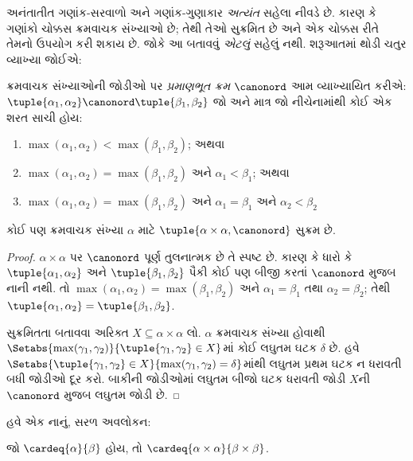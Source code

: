 \label{guunit:OLP-0588}


અનંતાતીત ગણાંક-સરવાળો અને ગણાંક-ગુણાકાર
\emph{અત્યંત} સહેલા નીવડે છે. કારણ કે ગણાંકો
ચોક્કસ ક્રમવાચક સંખ્યાઓ છે; તેથી તેઓ સુક્રમિત
છે અને એક ચોક્કસ રીતે તેમનો ઉપયોગ કરી શકાય છે.
જોકે આ બતાવવું \emph{એટલું} સહેલું નથી. શરૂઆતમાં
થોડી ચતુર વ્યાખ્યા જોઈએ:

\begin{defn}
ક્રમવાચક સંખ્યાઓની જોડીઓ પર \emph{પ્રમાણભૂત ક્રમ}
$\canonord$ આમ વ્યાખ્યાયિત કરીએ:
$\tuple{\alpha_1, \alpha_2} \canonord
\tuple{\beta_1, \beta_2}$ જો અને માત્ર જો નીચેનામાંથી
કોઈ એક શરત સાચી હોય:
\begin{enumerate}
	\item $\max(\alpha_1, \alpha_2) < \max(\beta_1, \beta_2)$; અથવા
	\item $\max(\alpha_1, \alpha_2) = \max(\beta_1, \beta_2)$ અને
	$\alpha_1 < \beta_1$; અથવા
	\item $\max(\alpha_1, \alpha_2) = \max(\beta_1, \beta_2)$ અને
	$\alpha_1 = \beta_1$ અને $\alpha_2 < \beta_2$
\end{enumerate}
\end{defn}

\begin{lem}
કોઈ પણ ક્રમવાચક સંખ્યા $\alpha$ માટે
$\tuple{\alpha \times \alpha, \canonord}$ સુક્રમ છે.
\end{lem}

\begin{proof}
$\alpha \times \alpha$ પર $\canonord$ પૂર્ણ તુલનાત્મક છે
તે સ્પષ્ટ છે. કારણ કે ધારો કે
$\tuple{\alpha_1, \alpha_2}$ અને
$\tuple{\beta_1, \beta_2}$ પૈકી કોઈ પણ બીજી કરતાં
$\canonord$ મુજબ નાની નથી. તો
$\max(\alpha_1, \alpha_2) = \max(\beta_1, \beta_2)$
અને $\alpha_1 = \beta_1$ તથા $\alpha_2 = \beta_2$;
તેથી $\tuple{\alpha_1, \alpha_2} =
\tuple{\beta_1,  \beta_2}$.

સુક્રમિતતા બતાવવા અરિક્ત
$X \subseteq \alpha\times\alpha$ લો. $\alpha$
ક્રમવાચક સંખ્યા હોવાથી
$\Setabs{\max(\gamma_1, \gamma_2)}{\tuple{\gamma_1,
\gamma_2} \in X}$માં કોઈ લઘુતમ ઘટક $\delta$ છે.
હવે $\Setabs{\tuple{\gamma_1,\gamma_2} \in X}{\max(\gamma_1, \gamma_2) =
\delta}$માંથી લઘુતમ પ્રથમ ઘટક ન ધરાવતી બધી જોડીઓ
દૂર કરો. બાકીની જોડીઓમાં લઘુતમ બીજો ઘટક ધરાવતી
જોડી $X$ની $\canonord$ મુજબ લઘુતમ જોડી છે.
\end{proof}
\noindent
હવે એક નાનું, સરળ અવલોકન:

\begin{prop}
જો $\cardeq{\alpha}{\beta}$ હોય, તો
$\cardeq{\alpha \times \alpha}{\beta \times \beta}$.
\end{prop}

